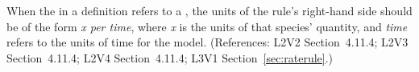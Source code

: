 When the  in a \RateRule definition refers to a \Species,
the units of the rule's right-hand side should be of the form \emph{x per
time}, where \emph{x} is the units of that species' quantity, and
\emph{time} refers to the units of time for the model.  (References: L2V2
Section~4.11.4; L2V3 Section~4.11.4; L2V4 Section~4.11.4; L3V1 Section~\ref{sec:raterule}.)
